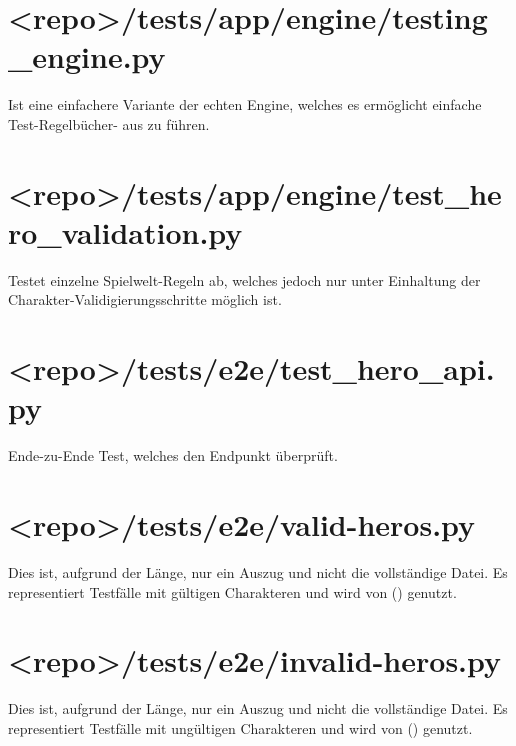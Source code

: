 \begin{landscape}
    \section{<repo>/tests/app/engine/testing\_engine.py}\label{sec:testing-engine.py}
    Ist eine einfachere Variante der echten Engine, welches es ermöglicht einfache Test-Regelbücher- aus zu führen.
    \vspace{-1em}

    \section{<repo>/tests/app/engine/test\_hero\_validation.py}\label{sec:test-hero-validation.py}
    Testet einzelne Spielwelt-Regeln ab, welches jedoch nur unter Einhaltung der Charakter-Validigierungsschritte möglich ist.
    \vspace{-1em}

    \section{<repo>/tests/e2e/test\_hero\_api.py}\label{sec:test-hero-api.py}
    Ende-zu-Ende Test, welches den  Endpunkt überprüft.
    \vspace{-1em}

    \section{<repo>/tests/e2e/valid-heros.py}\label{sec:valid-heros.py}
    Dies ist, aufgrund der Länge, nur ein Auszug und nicht die vollständige Datei.
    Es representiert Testfälle mit gültigen Charakteren und wird von  () genutzt.
    \vspace{-1em}

    \section{<repo>/tests/e2e/invalid-heros.py}\label{sec:invalid-heros.py}
    Dies ist, aufgrund der Länge, nur ein Auszug und nicht die vollständige Datei.
    Es representiert Testfälle mit ungültigen Charakteren und wird von  () genutzt.
    \vspace{-1em}

\end{landscape}
